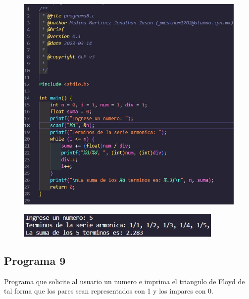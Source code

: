 \documentclass{article}
\begin{document}
\begin{figure}[H]
    \centering
    \includegraphics[width = 15cm]{img8a.jpg}
\end{figure}
\begin{figure}[H]
    \centering
    \includegraphics[width = 10cm]{img8b.jpg}
\end{figure}
\newpage
\subsection{Programa 9}

Programa que solicite al usuario un numero e imprima el triangulo de Floyd de tal forma que los pares sean representados con 1 y los impares con 0.
\end{document}
